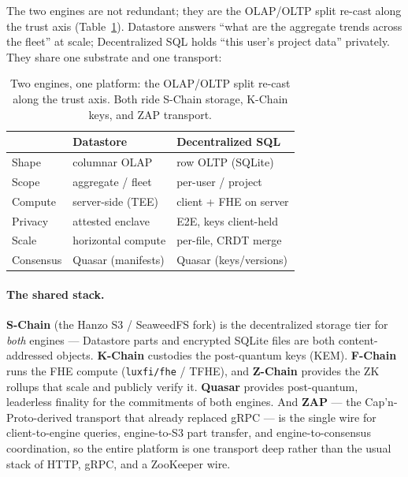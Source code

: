 The two engines are not redundant; they are the OLAP/OLTP split re-cast along the
trust axis (Table~\ref{tab:twoengine}). Datastore answers ``what are the
aggregate trends across the fleet'' at scale; Decentralized SQL holds ``this
user's project data'' privately. They share one substrate and one transport:

\begin{table}[H]
\centering
\small
\begin{tabular}{@{}lll@{}}
\toprule
 & \textbf{Datastore} & \textbf{Decentralized SQL} \\
\midrule
Shape      & columnar OLAP        & row OLTP (SQLite) \\
Scope      & aggregate / fleet    & per-user / project \\
Compute    & server-side (TEE)    & client + FHE on server \\
Privacy    & attested enclave     & E2E, keys client-held \\
Scale      & horizontal compute   & per-file, CRDT merge \\
Consensus  & Quasar (manifests)   & Quasar (keys/versions) \\
\bottomrule
\end{tabular}
\caption{Two engines, one platform: the OLAP/OLTP split re-cast along the trust
axis. Both ride S-Chain storage, K-Chain keys, and ZAP transport.}
\label{tab:twoengine}
\end{table}

\paragraph{The shared stack.} \textbf{S-Chain} (the Hanzo S3 / SeaweedFS fork)
is the decentralized storage tier for \emph{both} engines --- Datastore parts and
encrypted SQLite files are both content-addressed objects. \textbf{K-Chain}
custodies the post-quantum keys (KEM). \textbf{F-Chain} runs the FHE compute
(\texttt{luxfi/fhe} / TFHE), and \textbf{Z-Chain} provides the ZK rollups that
scale and publicly verify it. \textbf{Quasar} provides post-quantum, leaderless
finality for the commitments of both engines. And \textbf{ZAP} --- the
Cap'n-Proto-derived transport that already replaced gRPC --- is the single wire
for client-to-engine queries, engine-to-S3 part transfer, and
engine-to-consensus coordination, so the entire platform is one transport deep
rather than the usual stack of HTTP, gRPC, and a ZooKeeper wire.

